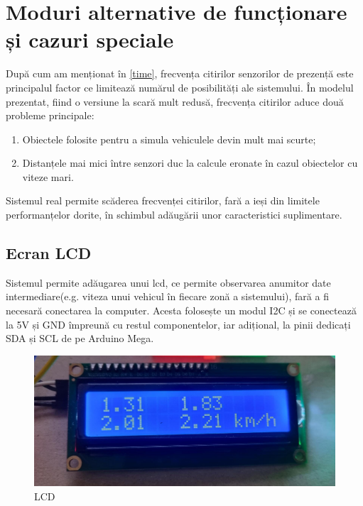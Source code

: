 \chapter{Moduri alternative de funcționare și cazuri speciale}
\label{chap:extra}

 După cum am menționat în \autoref{time}, frecvența citirilor senzorilor de prezență este principalul factor ce limitează numărul de posibilități ale sistemului. În modelul prezentat, fiind o versiune la scară mult redusă, frecvența citirilor aduce două probleme principale:

\begin{enumerate}
\item Obiectele folosite pentru a simula vehiculele devin mult mai scurte;

\item Distanțele mai mici între senzori duc la calcule eronate în cazul obiectelor cu viteze mari. 

\end{enumerate}

 Sistemul real permite scăderea frecvenței citirilor, fară a ieși din limitele performanțelor dorite, în schimbul adăugării unor caracteristici suplimentare.

 \section{Ecran LCD}

\indent \indent Sistemul permite adăugarea unui  \gls{lcd}, ce permite observarea anumitor date intermediare(e.g. viteza unui vehicul în fiecare zonă a sistemului), fară a fi necesară conectarea la computer. Acesta folosește un modul I2C și se conectează la 5V și GND împreună cu restul componentelor, iar adițional, la pinii dedicați SDA și SCL de pe Arduino Mega.

\begin{figure}[!ht]
    \begin{center}
    \includegraphics[width=0.5\linewidth,keepaspectratio]{pics/LCD.jpg}
    \end{center}
    \caption{LCD}
    \label{fig:LCD}
\end{figure}



